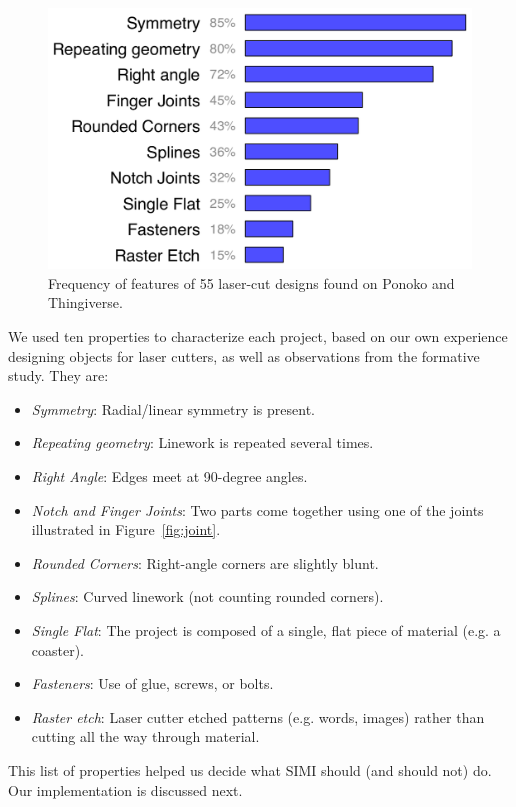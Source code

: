 \begin{figure}[h]
  \centering
  \includegraphics[width=0.9\linewidth]{img/ponoko-graph.pdf}
  \caption{Frequency of features of 55 laser-cut designs found on
    Ponoko and Thingiverse.}
  \label{fig:ponoko}
\end{figure}

We used ten properties to characterize each project, based on our own
experience designing objects for laser cutters, as well as
observations from the formative study. They are:

\begin{itemize}
\item \textit{Symmetry}: Radial/linear symmetry is present.
\item \textit{Repeating geometry}: Linework is repeated several times.
\item \textit{Right Angle}: Edges meet at 90-degree angles.
\item \textit{Notch and Finger Joints}: Two parts come together using one of
  the joints illustrated in Figure~\ref{fig:joint}.
\item \textit{Rounded Corners}: Right-angle corners are slightly blunt.
\item \textit{Splines}: Curved linework (not counting rounded corners).
\item \textit{Single Flat}: The project is composed of a single, flat
  piece of material (e.g. a coaster).
\item \textit{Fasteners}: Use of glue, screws, or bolts.
\item \textit{Raster etch}: Laser cutter etched patterns (e.g. words,
  images) rather than cutting all the way through material.
\end{itemize}

This list of properties helped us decide what SIMI should (and should
not) do. Our implementation is discussed next.

